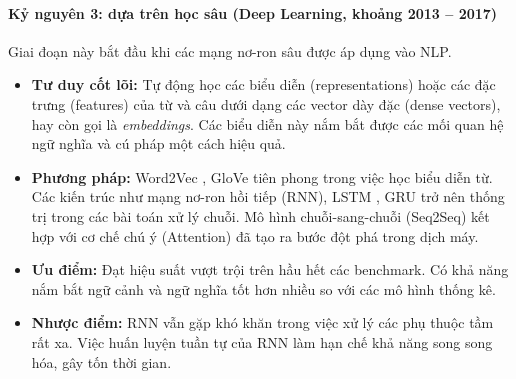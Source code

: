 \paragraph{Kỷ nguyên 3: dựa trên học sâu (Deep Learning, khoảng 2013 -- 2017)}
Giai đoạn này bắt đầu khi các mạng nơ-ron sâu được áp dụng vào NLP.
\begin{itemize}
    \item \textbf{Tư duy cốt lõi:} Tự động học các biểu diễn (representations) hoặc các đặc trưng (features) của từ và câu dưới dạng các vector dày đặc (dense vectors), hay còn gọi là \textit{embeddings}. Các biểu diễn này nắm bắt được các mối quan hệ ngữ nghĩa và cú pháp một cách hiệu quả.
    \item \textbf{Phương pháp:} Word2Vec \cite{mikolov2013efficient}, GloVe \cite{pennington2014glove} tiên phong trong việc học biểu diễn từ. Các kiến trúc như mạng nơ-ron hồi tiếp (RNN), LSTM \cite{hochreiter1997long}, GRU \cite{cho2014learning} trở nên thống trị trong các bài toán xử lý chuỗi. Mô hình chuỗi-sang-chuỗi (Seq2Seq) \cite{sutskever2014sequence} kết hợp với cơ chế chú ý (Attention) \cite{bahdanau2014neural} đã tạo ra bước đột phá trong dịch máy.
    \item \textbf{Ưu điểm:} Đạt hiệu suất vượt trội trên hầu hết các benchmark. Có khả năng nắm bắt ngữ cảnh và ngữ nghĩa tốt hơn nhiều so với các mô hình thống kê.
    \item \textbf{Nhược điểm:} RNN vẫn gặp khó khăn trong việc xử lý các phụ thuộc tầm rất xa. Việc huấn luyện tuần tự của RNN làm hạn chế khả năng song song hóa, gây tốn thời gian.
\end{itemize}

